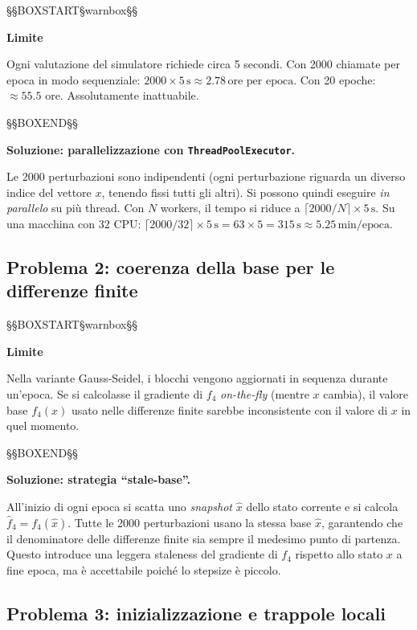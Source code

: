 \documentclass[12pt,a4paper]{article}
\theoremstyle{definition}
\begin{document}
\noindent §§BOXSTART§warnbox§§

\textbf{Limite}


Ogni valutazione del simulatore richiede circa 5 secondi.
Con 2000 chiamate per epoca in modo sequenziale:
$2000 \times 5\,\text{s} \approx 2.78\,\text{ore per epoca}$.
Con 20 epoche: $\approx 55.5$ ore. Assolutamente inattuabile.


\noindent §§BOXEND§§



\textbf{Soluzione: parallelizzazione con \texttt{ThreadPoolExecutor}.}

Le 2000 perturbazioni sono indipendenti (ogni perturbazione riguarda un diverso indice del vettore
$x$, tenendo fissi tutti gli altri). Si possono quindi eseguire \emph{in parallelo} su più thread.
Con $N$ workers, il tempo si riduce a $\lceil 2000/N \rceil \times 5\,\text{s}$.
Su una macchina con 32 CPU: $\lceil 2000/32 \rceil \times 5\,\text{s} = 63 \times 5 = 315\,\text{s}
\approx 5.25\,\text{min/epoca}$.

\subsection{Problema 2: coerenza della base per le differenze finite}



\noindent §§BOXSTART§warnbox§§

\textbf{Limite}


Nella variante Gauss-Seidel, i blocchi vengono aggiornati in sequenza durante un'epoca.
Se si calcolasse il gradiente di $f_4$ \emph{on-the-fly} (mentre $x$ cambia),
il valore base $f_4(x)$ usato nelle differenze finite sarebbe inconsistente con il valore
di $x$ in quel momento.


\noindent §§BOXEND§§



\textbf{Soluzione: strategia ``stale-base''.}

All'inizio di ogni epoca si scatta uno \emph{snapshot} $\hat{x}$ dello stato corrente e si
calcola $\hat{f}_4 = f_4(\hat{x})$. Tutte le 2000 perturbazioni usano la stessa base $\hat{x}$,
garantendo che il denominatore delle differenze finite sia sempre il medesimo punto di partenza.
Questo introduce una leggera staleness del gradiente di $f_4$ rispetto allo stato $x$ a fine epoca,
ma è accettabile poiché lo stepsize è piccolo.

\subsection{Problema 3: inizializzazione e trappole locali}
\end{document}
